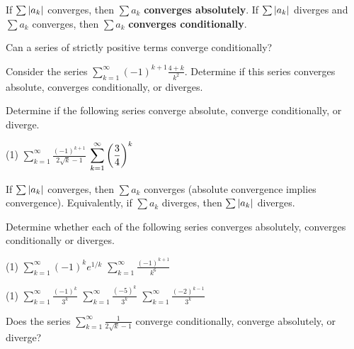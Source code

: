 \documentclass[../mathNotesPreamble]{subfiles}
\begin{document}
  \begin{defn*}
    If $\sum{\left\vert a_k\right\vert}$ converges, then $\sum a_k$ \textbf{converges absolutely}.\newline
    If $\sum{\left\vert a_k\right\vert}$ diverges and $\sum a_k$ converges, then $\sum a_k$ \textbf{converges conditionally}.
  \end{defn*}
  \begin{ex*}
    Can a series of strictly positive terms converge conditionally?
  \end{ex*}
  \begin{ex*}
    Consider the series $\displaystyle\sum_{k=1}^\infty (-1)^{k+1}\frac{4+k}{k^2}$. Determine if this series converges absolute, converges conditionally, or diverges.
  \end{ex*}
  \pagebreak

  \begin{ex*}
    Determine if the following series converge absolute, converge conditionally, or diverge.
  \end{ex*}
  \begin{tasks}[after-item-skip=\stretch{1}, label=,item-indent=0pt](1)
    \task $\displaystyle\sum_{k=1}^\infty \frac{(-1)^{k+1}}{2\sqrt{k}-1}$
    \task $\displaystyle\sum_{k=1}^\infty {\left(\frac{3}{4}\right)}^k$
  \end{tasks}
  \pagebreak

  \begin{thmBox*}
    If $\sum {\left\vert a_k\right\vert}$ converges, then $\sum a_k$ converges (absolute convergence implies convergence). Equivalently, if $\sum a_k$ diverges, then $\sum{\left\vert a_k\right\vert}$ diverges.
  \end{thmBox*}
  \begin{ex*}
    Determine whether each of the following series converges absolutely, converges conditionally or diverges.
  \end{ex*}
  \begin{tasks}[after-item-skip=\stretch{1}, label=,item-indent=0pt](1)
    \task $\displaystyle\sum_{k=1}^\infty (-1)^ke^{1/k}$
    \task $\displaystyle\sum_{k=1}^\infty \frac{(-1)^{k+1}}{k^6}$
  \end{tasks}
  \pagebreak

  \begin{tasks}[after-item-skip=\stretch{1}, label=,item-indent=0pt](1)
    \task $\displaystyle\sum_{k=1}^\infty \frac{(-1)^k}{3^k}$
    \task $\displaystyle\sum_{k=1}^\infty \frac{(-5)^k}{3^k}$
    \task $\displaystyle\sum_{k=1}^\infty \frac{(-2)^{k-1}}{3^k}$
  \end{tasks}
  \pagebreak

  \begin{ex*}
    Does the series $\displaystyle\sum_{k=1}^\infty \frac{1}{2\sqrt{k}-1}$ converge conditionally, converge absolutely, or diverge?
  \end{ex*}
  \pagebreak
\end{document}
